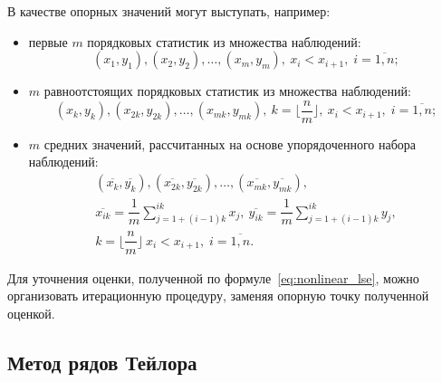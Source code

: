 В качестве опорных значений могут выступать, например:
\begin{itemize}
\item первые \( m \) порядковых статистик из множества наблюдений:
  \[
    (x_1, y_1), (x_2, y_2), \dotsc , (x_m, y_m), \:
    x_i < x_{i+1}, \;
    i = \overline{1, n};
  \]
\item \( m \) равноотстоящих порядковых статистик из множества наблюдений:
  \[
    (x_{k}, y_{k}), (x_{2k}, y_{2k}) , \dotsc , (x_{mk}, y_{mk}), \:
    k = \lfloor \dfrac{n}{m} \rfloor, \:
    x_i < x_{i+1}, \;
    i = \overline{1, n};
  \]
\item \( m \) средних значений, рассчитанных на основе
  упорядоченного набора наблюдений:
  \begin{equation}
    \begin{gathered}
      ( \overline{x_{k}}, \overline{y_{k}} ),
      ( \overline{x_{2k}}, \overline{y_{2k}} ),
      \dotsc ,
      ( \overline{x_{mk}}, \overline{y_{mk}}), \\
      \overline{x_{ik}} = \dfrac{1}{m} \sum_{j = 1+(i-1)k}^{ik} x_j, \:
      \overline{y_{ik}} = \dfrac{1}{m} \sum_{j = 1+(i-1)k}^{ik} y_j, \\
      k = \lfloor \dfrac{n}{m} \rfloor \:
      x_i < x_{i+1}, \; i = \overline{1, n}.
    \end{gathered}
    \label{eq:nonlinear_base_values}
  \end{equation}
\end{itemize}

Для уточнения оценки, полученной по формуле~\eqref{eq:nonlinear_lse}, можно
организовать итерационную процедуру, заменяя опорную точку полученной оценкой.

\vspace{2\baselineskip}
\subsection{Метод рядов Тейлора}

